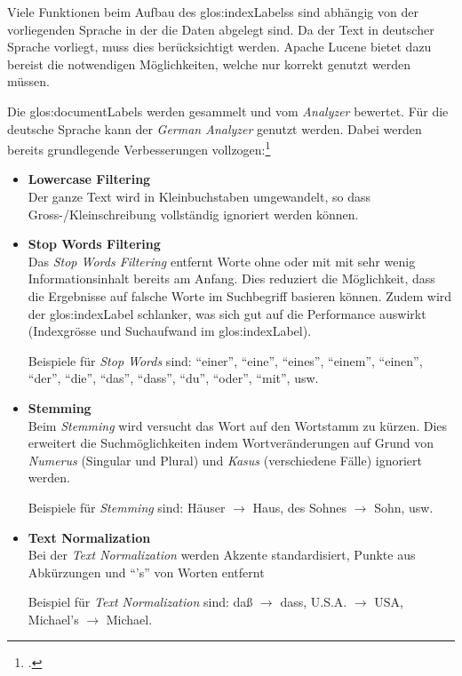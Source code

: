 Viele Funktionen beim Aufbau des \glspl{glos:indexLabel}s sind abhängig von der vorliegenden Sprache in der die Daten abgelegt sind.
Da der Text in deutscher Sprache vorliegt, muss dies berücksichtigt werden.
Apache Lucene bietet dazu bereist die notwendigen Möglichkeiten, welche nur korrekt genutzt werden müssen.

Die \glspl{glos:documentLabel} werden gesammelt und vom \textit{Analyzer} bewertet. Für die deutsche Sprache kann der \textit{German Analyzer} genutzt werden.
Dabei werden bereits grundlegende Verbesserungen vollzogen:\footcite{Inner_workings_of_the_German_Analyzer_in_Lucene_2016-05-08}
\begin{itemize}[noitemsep]
	\item \textbf{Lowercase Filtering}\\
	Der ganze Text wird in Kleinbuchstaben umgewandelt, so dass Gross-/Kleinschreibung vollständig ignoriert werden können.

	\item \textbf{Stop Words Filtering}\\
	Das \textit{Stop Words Filtering} entfernt Worte ohne oder mit mit sehr wenig Informationsinhalt bereits am Anfang.
	Dies reduziert die Möglichkeit, dass die Ergebnisse auf falsche Worte im Suchbegriff basieren können.
	Zudem wird der \gls{glos:indexLabel} schlanker, was sich gut auf die Performance auswirkt (Indexgrösse und Suchaufwand im \gls{glos:indexLabel}).

	Beispiele für \textit{Stop Words} sind:
	"`einer"', "`eine"', "`eines"', "`einem"', "`einen"', "`der"', "`die"', "`das"', "`dass"', "`du"', "`oder"', "`mit"', usw.

	\item \textbf{Stemming}\\
	Beim \textit{Stemming} wird versucht das Wort auf den Wortstamm zu kürzen.
	Dies erweitert die Suchmöglichkeiten indem Wortveränderungen auf Grund von \textit{Numerus} (Singular und Plural) und \textit{Kasus} (verschiedene Fälle) ignoriert werden.

	Beispiele für \textit{Stemming} sind:
	Häuser $\rightarrow$ Haus, des Sohnes $\rightarrow$ Sohn, usw.

	\item \textbf{Text Normalization}\\
	Bei der \textit{Text Normalization} werden Akzente standardisiert, Punkte aus Abkürzungen und "`'s"' von Worten entfernt

	Beispiel für \textit{Text Normalization} sind:
	daß $\rightarrow$ dass, U.S.A. $\rightarrow$ USA, Michael's $\rightarrow$ Michael.

\end{itemize}

